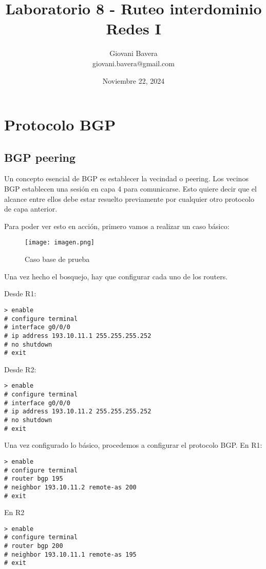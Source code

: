 \documentclass{article}
\title{Laboratorio 8 - Ruteo interdominio \\ Redes I}
\author{Giovani Bavera \\ giovani.bavera@gmail.com}
\date{Noviembre 22, 2024}
\begin{document}
\maketitle

\section{Protocolo BGP}
\subsection{BGP peering}

Un concepto esencial de BGP es establecer la vecindad o peering. Los vecinos BGP establecen una sesión en capa 4 para comunicarse. Esto quiere decir que el alcance entre ellos debe estar resuelto
previamente por cualquier otro protocolo de capa anterior.

Para poder ver esto en acción, primero vamos a realizar un caso básico: 

\begin{figure}[H]
    \centering
    \texttt{[image: imagen.png]}
    \caption{Caso base de prueba}
    \label{fig:enter-label}
\end{figure}

Una vez hecho el bosquejo, hay que configurar cada uno de los routers. 

Desde R1: 

\begin{verbatim}
> enable
# configure terminal
# interface g0/0/0
# ip address 193.10.11.1 255.255.255.252
# no shutdown
# exit
\end{verbatim}

Desde R2: 

\begin{verbatim}
> enable
# configure terminal
# interface g0/0/0
# ip address 193.10.11.2 255.255.255.252
# no shutdown
# exit
\end{verbatim}

Una vez configurado lo básico, procedemos a configurar el protocolo BGP. En R1: 

\begin{verbatim}
> enable
# configure terminal
# router bgp 195
# neighbor 193.10.11.2 remote-as 200
# exit
\end{verbatim}

En R2

\begin{verbatim}
> enable
# configure terminal
# router bgp 200
# neighbor 193.10.11.1 remote-as 195
# exit
\end{verbatim}
\end{document}
